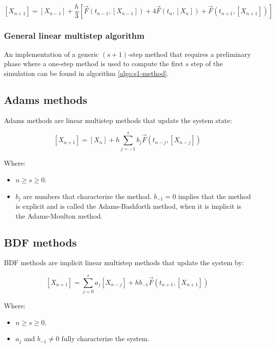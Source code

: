    $$[X_{n+1}] = [X_{n-1}] + \frac{h}{3}[\vec{F}(t_{n-1}, [X_{n-1}]) + 4\vec{F}(t_n, [X_n]) + \vec{F}(t_{n+1}, [X_{n+1}])]$$

    \subsubsection{General linear multistep algorithm}
    An implementation of a generic $(s+1)$-step method that requires a preliminary phase where a one-step method is used to compute the first $s$ step of the simulation can be found in algorithm \ref{algo:s1-method}.

    

  \subsection{Adams methods}
  Adams methods are linear multistep methods that update the system state:

  $$[X_{n+1}] = [X_n] + h\sum\limits_{j=-1}^sb_j\vec{F}(t_{n-j}, [X_{n-j}])$$

  Where:

  \begin{multicols}{2}
    \begin{itemize}
      \item $n\ge s\ge 0$.
      \item $b_j$ are numbers that characterize the method.
        $b_{-1} = 0$ implies that the method is explicit and is called the Adams-Bashforth method, when it is implicit is the Adams-Moulton method.
    \end{itemize}
  \end{multicols}

  \subsection{BDF methods}
  BDF methods are implicit linear multistep methods that update the system by:

  $$[X_{n+1}] = \sum\limits_{j=0}^sa_j[X_{n-j}] + hb_{-1}\vec{F}(t_{n+1}, [X_{n+1}])$$

  Where:

  \begin{multicols}{2}
    \begin{itemize}
      \item $n\ge s\ge 0$.
      \item $a_j$ and $b_{-1}\neq 0$ fully characterize the system.
    \end{itemize}
  \end{multicols}

